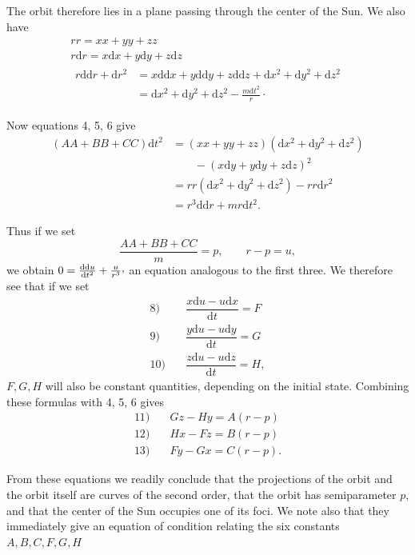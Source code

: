 \par The orbit therefore lies in a plane passing through the center of the Sun. We also have
\[
\begin{gathered}
rr=xx+yy+zz\\
r\mathrm{d}r=x\mathrm{d}x+y\mathrm{d}y+z\mathrm{d}z\\
\begin{aligned}
r\mathrm{dd}r+\mathrm{d}r^2&=x\mathrm{dd}x+y\mathrm{dd}y+z\mathrm{dd}z+\mathrm{d}x^2+\mathrm{d}y^2+\mathrm{d}z^2\\
&=\mathrm{d}x^2+\mathrm{d}y^2+\mathrm{d}z^2-\frac{m\mathrm{d}t^2}{r}\mathpunct{\cdot}
\end{aligned}
\end{gathered}
\]
\par Now equations 4, 5, 6 give
\[
\begin{aligned}
(AA+BB+CC)\mathrm{d}t^2
&=(xx+yy+zz)(\mathrm{d}x^2+\mathrm{d}y^2+\mathrm{d}z^2)\\
&\qquad{}-(x\mathrm{d}y+y\mathrm{d}y+z\mathrm{d}z)^2\\
&=rr(\mathrm{d}x^2+\mathrm{d}y^2+\mathrm{d}z^2)-rr\mathrm{d}r^2\\
&=r^3\mathrm{dd}r+mr\mathrm{d}t^2.
\end{aligned}
\]
\par Thus if we set
\[
\frac{AA+BB+CC}{m}=p,\qquad r-p=u,
\]
we obtain \(0=\frac{\mathrm{dd}u}{\mathrm{d}t^2}+\frac{u}{r^3}\mathpunct{\raisebox{.45ex}{,}}\) an equation analogous to the first three. We therefore see that if we set
\[
\begin{array}{rl}
8)\quad&\dfrac{x\mathrm{d}u-u\mathrm{d}x}{\mathrm{d}t}=F\\[5pt]
9)\quad&\dfrac{y\mathrm{d}u-u\mathrm{d}y}{\mathrm{d}t}=G\\[5pt]
10)\quad&\dfrac{z\mathrm{d}u-u\mathrm{d}z}{\mathrm{d}t}=H,
\end{array}
\]
\(F,G,H\) will also be constant quantities, depending on the initial state. Combining these formulas with 4, 5, 6 gives
\[
\begin{array}{rl}
11)\quad&Gz-Hy=A(r-p)\\
12)\quad&Hx-Fz=B(r-p)\\
13)\quad&Fy-Gx=C(r-p).
\end{array}
\]
\par From these equations we readily conclude that the projections of the orbit and the orbit itself are curves of the second order, that the orbit has semiparameter \(p\), and that the center of the Sun occupies one of its foci. We note also that they immediately give an equation of condition relating the six constants \(A,B,C,F,G,H\)

